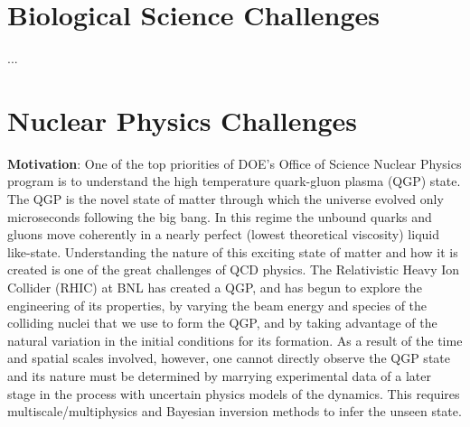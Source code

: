 \documentclass[11pt]{article}
\begin{document}
\section{Biological Science Challenges}
...

\section{Nuclear Physics Challenges}
\hspace{0.5cm} {\bf Motivation}:
One of the top priorities of DOE's Office of Science Nuclear Physics
program is to understand the high temperature quark-gluon plasma (QGP)
state.  The QGP is the novel state of matter through which the
universe evolved only microseconds following the big bang.  In this
regime the unbound quarks and gluons move coherently in a nearly
perfect (lowest theoretical viscosity) liquid like-state.
Understanding the nature of this exciting state of matter and how it
is created is one of the great challenges of QCD physics.  The
Relativistic Heavy Ion Collider (RHIC) at BNL has created a QGP, and 
has begun to explore the engineering of its properties, by varying 
the beam energy and species of the colliding nuclei that we use to 
form the QGP, and by taking advantage of the natural
variation in the initial conditions for its formation.  As a
result of the time and spatial scales involved, however, one cannot
directly observe the QGP state and its nature must be determined by
marrying experimental data of a later stage in the process with
uncertain physics models of the dynamics.  This requires
multiscale/multiphysics and Bayesian inversion methods to infer the
unseen state.  
\end{document}
